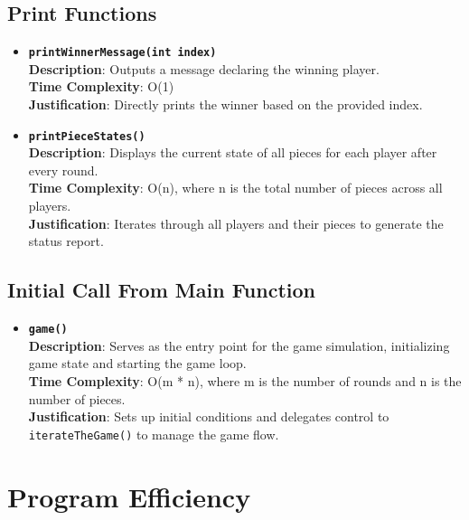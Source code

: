 \documentclass{article}
\begin{document}
        \subsection{Print Functions}
        
        \begin{itemize}
            \item \textbf{\texttt{printWinnerMessage(int index)}}\\
            \textbf{Description}: Outputs a message declaring the winning player.\\
            \textbf{Time Complexity}: O(1)\\
            \textbf{Justification}: Directly prints the winner based on the provided index.
            
            \item \textbf{\texttt{printPieceStates()}}\\
            \textbf{Description}: Displays the current state of all pieces for each player after every round.\\
            \textbf{Time Complexity}: O(n), where n is the total number of pieces across all players.\\
            \textbf{Justification}: Iterates through all players and their pieces to generate the status report.
        \end{itemize}
        
        \subsection{Initial Call From Main Function}
        
        \begin{itemize}
            \item \textbf{\texttt{game()}}\\
            \textbf{Description}: Serves as the entry point for the game simulation, initializing game state and starting the game loop.\\
            \textbf{Time Complexity}: O(m * n), where m is the number of rounds and n is the number of pieces.\\
            \textbf{Justification}: Sets up initial conditions and delegates control to \texttt{iterateTheGame()} to manage the game flow.
        \end{itemize}
        
        \section{Program Efficiency}
        
\end{document}

